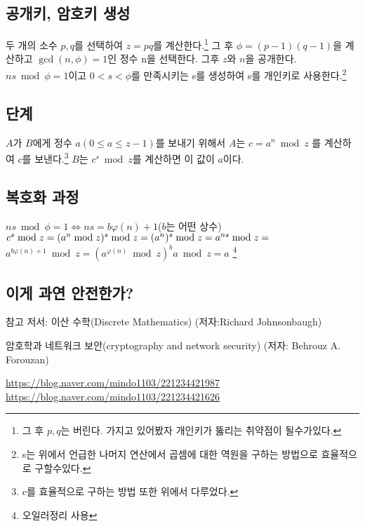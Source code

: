 \documentclass{oblivoir}
\begin{document}
\subsection{공개키, 암호키 생성}
두 개의 소수 $p,q$를 선택하여 $z=pq$를 계산한다.\footnote{그 후 $p ,q$는 버린다. 가지고 있어봤자 개인키가 뚫리는 취약점이 될수가있다.} 그 후 $\phi =(p-1)(q-1)$을 계산하고 $\gcd(n,\phi)=1$인 정수 n을 선택한다. 그후 $z$와 $n$을 공개한다. $ns\bmod \phi =1$이고 $0<s<\phi$를 만족시키는 s를 생성하여 s를 개인키로 사용한다.\footnote{s는 위에서 언급한 나머지 연산에서 곱셈에 대한 역원을 구하는 방법으로 효율적으로  구할수있다.}\par
\subsection{단계}
$A$가 $B$에게 정수 $a(0\le a\le z-1)$를 보내기 위해서 $A$는 $c=a^n \bmod z$ 를 계산하여 $c$를 보낸다.\footnote{c를 효율적으로 구하는 방법 또한 위에서 다루었다.}
$B$는 $c^s \bmod z$를 계산하면 이 값이 $a$이다.\par
\subsection{복호화 과정}

$ ns\bmod \phi =1 \Longleftrightarrow ns = b\varphi(n)+1$($b$는 어떤 상수)
\newline 
$c^s \bmod z=(a^n \bmod z)^s \bmod z = (a^n)^s \bmod z \newline = a^{ns}\bmod z =$
$a^{b\varphi(n)+1}\bmod z =(a^{\varphi(n)} \bmod z)^{b} a \bmod z =a$ \footnote{오일러정리 사용}

\subsection{이게 과연 안전한가?}


\newpage
참고 저서: 이산 수학(Discrete Mathematics) (저자:Richard Johnsonbaugh)\par
암호학과 네트워크 보안(cryptography and network security) (저자: Behrouz A. Forouzan)


\url{ https://blog.naver.com/mindo1103/221234421987}
\newline
\url{https://blog.naver.com/mindo1103/221234421626}
\end{document}
